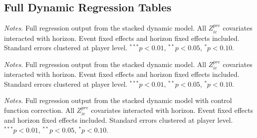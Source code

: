 \subsection{Full Dynamic Regression Tables}
\label{app:dynamic_full}

\begin{table}[htbp]
\centering
\caption{ATP Grand Slam: Full Dynamic Effects Regression}
\label{tab:dynamic_full_atp}
\begin{threeparttable}
\footnotesize

\begin{tablenotes}
\scriptsize
\item \textit{Notes.} Full regression output from the stacked dynamic model. All $Z^{pre}_{ie}$ covariates interacted with horizon. Event fixed effects and horizon fixed effects included. Standard errors clustered at player level. $^{***}p<0.01$, $^{**}p<0.05$, $^{*}p<0.10$.
\end{tablenotes}
\end{threeparttable}
\end{table}

\begin{table}[htbp]
\centering
\caption{WTA Grand Slam: Full Dynamic Effects Regression}
\label{tab:dynamic_full_wta}
\begin{threeparttable}
\footnotesize

\begin{tablenotes}
\scriptsize
\item \textit{Notes.} Full regression output from the stacked dynamic model. All $Z^{pre}_{ie}$ covariates interacted with horizon. Event fixed effects and horizon fixed effects included. Standard errors clustered at player level. $^{***}p<0.01$, $^{**}p<0.05$, $^{*}p<0.10$.
\end{tablenotes}
\end{threeparttable}
\end{table}

\begin{table}[htbp]
\centering
\caption{ATP Non-Grand-Slam: Full Dynamic Effects Regression}
\label{tab:dynamic_full_nongs_atp}
\begin{threeparttable}
\footnotesize

\begin{tablenotes}
\scriptsize
\item \textit{Notes.} Full regression output from the stacked dynamic model with control function correction. All $Z^{pre}_{ie}$ covariates interacted with horizon. Event fixed effects and horizon fixed effects included. Standard errors clustered at player level. $^{***}p<0.01$, $^{**}p<0.05$, $^{*}p<0.10$.
\end{tablenotes}
\end{threeparttable}
\end{table}

